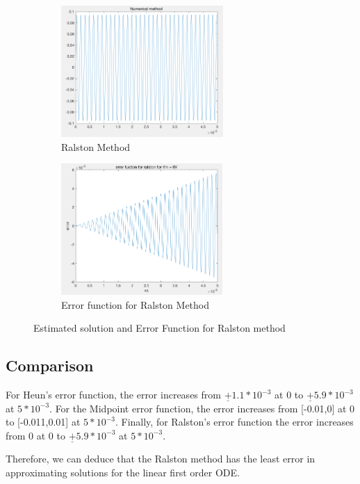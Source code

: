 \documentclass[11pt,a4paper]{article}
\begin{document}
\begin{figure}[h]
\begin{subfigure}{.5\textwidth}
  \includegraphics[width=.9\linewidth,height = 5cm
  ]{Ex2_Figs/ralston_error_numerical_method}
  \caption[right]{Ralston Method}
  \label{fig:ralston_method}
\end{subfigure}
\begin{subfigure}{.5\textwidth}
  \includegraphics[width=.9\linewidth,height = 5cm]{Ex2_Figs/ralston_error}
  \caption{Error function for Ralston Method}
  \label{fig:ralston_error}
\end{subfigure}
\caption{Estimated solution and Error Function for Ralston method}
\label{fig:Ralston_Error_sub}
\end{figure}



\clearpage

\subsection{Comparison}
For Heun's error function, the error increases from
$\underline{+}1.1*10^{-3}$ at 0 to $\underline{+}5.9*10^{-3}$ at $5*10^{-3}$. For the Midpoint error function, the error increases from [-0.01,0] at 0 to [-0.011,0.01] at $5*10^{-3}$.
Finally, for Ralston's error function the error increases from 0 at 0 to $\underline{+}5.9*10^{-3}$ at $5*10^{-3}$.

Therefore, we can deduce that the Ralston method has the least error in approximating solutions for the linear first order ODE. %
\end{document}
